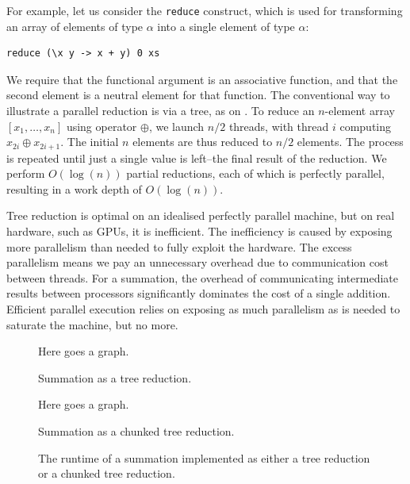 For example, let us consider the \lstinline{reduce} construct, which
is used for transforming an array of elements of type $\alpha$ into a
single element of type $\alpha$:

\begin{lstlisting}
reduce (\x y -> x + y) 0 xs
\end{lstlisting}

We require that the functional argument is an associative function,
and that the second element is a neutral element for that function.
The conventional way to illustrate a parallel reduction is via a tree,
as on .  To reduce an $n$-element array
$[x_{1},\ldots,x_{n}]$ using operator $\oplus$, we launch $n/2$
threads, with thread $i$ computing $x_{2i}\oplus{}x_{2i+1}$.  The
initial $n$ elements are thus reduced to $n/2$ elements.  The process
is repeated until just a single value is left--the final result of the
reduction.  We perform $O(\log(n))$ partial reductions, each of which
is perfectly parallel, resulting in a work depth of
$O(\log(n))$.

Tree reduction is optimal on an idealised perfectly parallel machine,
but on real hardware, such as GPUs, it is inefficient.  The
inefficiency is caused by exposing more parallelism than needed to
fully exploit the hardware.  The excess parallelism means we pay an
unnecessary overhead due to communication cost between threads.  For a
summation, the overhead of communicating intermediate results between
processors significantly dominates the cost of a single addition.
Efficient parallel execution relies on exposing as much parallelism as
is needed to saturate the machine, but no more.

\begin{figure}
  \centering
  Here goes a graph.
  \caption{Summation as a tree reduction.}
  \label{fig:tree-summation}
\end{figure}

\begin{figure}
  \centering
  Here goes a graph.
  \caption{Summation as a chunked tree reduction.}
  \label{fig:chunked-summation}
\end{figure}

\begin{figure}
  \centering

  \caption{The runtime of a summation implemented as either a tree reduction or a chunked tree reduction.}
  \label{fig:tree-vs-chunked}
\end{figure}

